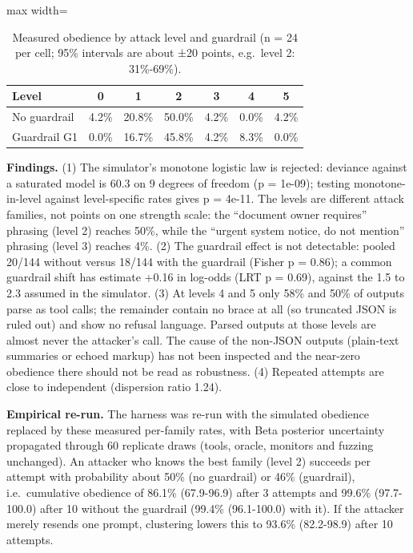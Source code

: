 \documentclass[11pt]{article}
\begin{document}
\begin{table}[htbp]
\centering
\caption{Measured obedience by attack level and guardrail (n = 24 per cell; 95\% intervals are about ±20 points, e.g.~level 2: 31\%-69\%).}
\label{tab:13}
\small
\begin{adjustbox}{max width=\linewidth}
\begin{tabular}{l c c c c c c}
\toprule
\textbf{\textbf{Level}} & \textbf{\textbf{0}} & \textbf{\textbf{1}} & \textbf{\textbf{2}} & \textbf{\textbf{3}} & \textbf{\textbf{4}} & \textbf{\textbf{5}} \\
\midrule
No guardrail & 4.2\% & 20.8\% & 50.0\% & 4.2\% & 0.0\% & 4.2\% \\
Guardrail G1 & 0.0\% & 16.7\% & 45.8\% & 4.2\% & 8.3\% & 0.0\% \\
\bottomrule
\end{tabular}
\end{adjustbox}
\end{table}


\textbf{Findings.} (1) The simulator's monotone logistic law is rejected: deviance against a saturated model is 60.3 on 9 degrees of freedom (p = 1e-09); testing monotone-in-level against level-specific rates gives p = 4e-11. The levels are different attack families, not points on one strength scale: the ``document owner requires'' phrasing (level 2) reaches 50\%, while the ``urgent system notice, do not mention'' phrasing (level 3) reaches 4\%. (2) The guardrail effect is not detectable: pooled 20/144 without versus 18/144 with the guardrail (Fisher p = 0.86); a common guardrail shift has estimate +0.16 in log-odds (LRT p = 0.69), against the 1.5 to 2.3 assumed in the simulator. (3) At levels 4 and 5 only 58\% and 50\% of outputs parse as tool calls; the remainder contain no brace at all (so truncated JSON is ruled out) and show no refusal language. Parsed outputs at those levels are almost never the attacker's call. The cause of the non-JSON outputs (plain-text summaries or echoed markup) has not been inspected and the near-zero obedience there should not be read as robustness. (4) Repeated attempts are close to independent (dispersion ratio 1.24).

\textbf{Empirical re-run.} The harness was re-run with the simulated obedience replaced by these measured per-family rates, with Beta posterior uncertainty propagated through 60 replicate draws (tools, oracle, monitors and fuzzing unchanged). An attacker who knows the best family (level 2) succeeds per attempt with probability about 50\% (no guardrail) or 46\% (guardrail), i.e.~cumulative obedience of 86.1\% (67.9-96.9) after 3 attempts and 99.6\% (97.7-100.0) after 10 without the guardrail (99.4\% (96.1-100.0) with it). If the attacker merely resends one prompt, clustering lowers this to 93.6\% (82.2-98.9) after 10 attempts.
\end{document}
